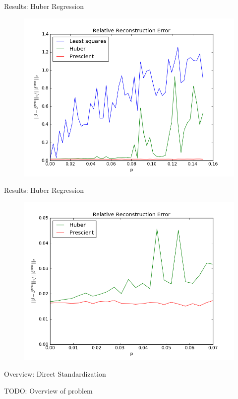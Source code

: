 \documentclass{beamer}
\begin{document}
\begin{frame}{Results: Huber Regression}
	\vfill
	\begin{figure}
		\includegraphics[width=1\textwidth]{figs/huber1.png}
	\end{figure}
	\vfill
\end{frame}

\begin{frame}{Results: Huber Regression}
	\vfill
	\begin{figure}
		\includegraphics[width=1\textwidth]{figs/huber2.png}
	\end{figure}
	\vfill
\end{frame}

\begin{frame}{Overview: Direct Standardization}
	\BIT
	\item TODO: Overview of problem
	\EIT
\end{frame}
\end{document}
